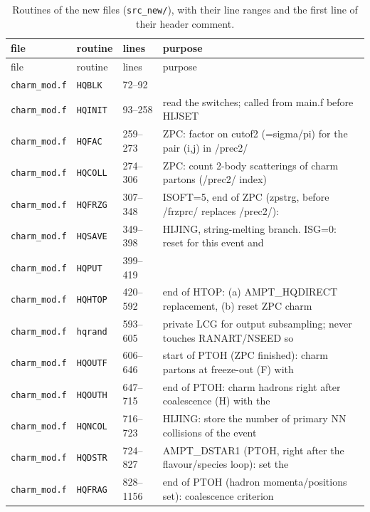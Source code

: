 {\small\begin{longtable}{@{}p{1.9cm}p{2.0cm}p{1.6cm}p{9.4cm}@{}}
\caption{Routines of the new files (\texttt{src\_new/}), with their line ranges and the first line of their header comment.}\label{tab:routines}\\
\toprule file & routine & lines & purpose \\ \midrule \endfirsthead
\toprule file & routine & lines & purpose \\ \midrule \endhead
\texttt{charm\_mod.f} & \texttt{HQBLK} & 72--92 &  \\
\texttt{charm\_mod.f} & \texttt{HQINIT} & 93--258 & read the switches; called from main.f before HIJSET \\
\texttt{charm\_mod.f} & \texttt{HQFAC} & 259--273 & ZPC: factor on cutof2 (=sigma/pi) for the pair (i,j) in /prec2/ \\
\texttt{charm\_mod.f} & \texttt{HQCOLL} & 274--306 & ZPC: count 2-body scatterings of charm partons (/prec2/ index) \\
\texttt{charm\_mod.f} & \texttt{HQFRZG} & 307--348 & ISOFT=5, end of ZPC (zpstrg, before /frzprc/ replaces /prec2/): \\
\texttt{charm\_mod.f} & \texttt{HQSAVE} & 349--398 & HIJING, string-melting branch.  ISG=0: reset for this event and \\
\texttt{charm\_mod.f} & \texttt{HQPUT} & 399--419 &  \\
\texttt{charm\_mod.f} & \texttt{HQHTOP} & 420--592 & end of HTOP: (a) AMPT\_\allowbreak{}HQDIRECT replacement, (b) reset ZPC charm \\
\texttt{charm\_mod.f} & \texttt{hqrand} & 593--605 & private LCG for output subsampling; never touches RANART/NSEED so \\
\texttt{charm\_mod.f} & \texttt{HQOUTF} & 606--646 & start of PTOH (ZPC finished): charm partons at freeze-out (F) with \\
\texttt{charm\_mod.f} & \texttt{HQOUTH} & 647--715 & end of PTOH: charm hadrons right after coalescence (H) with the \\
\texttt{charm\_mod.f} & \texttt{HQNCOL} & 716--723 & HIJING: store the number of primary NN collisions of the event \\
\texttt{charm\_mod.f} & \texttt{HQDSTR} & 724--827 & AMPT\_\allowbreak{}DSTAR1 (PTOH, right after the flavour/species loop): set the \\
\texttt{charm\_mod.f} & \texttt{HQFRAG} & 828--1156 & end of PTOH (hadron momenta/positions set): coalescence criterion \\

\end{longtable}}
